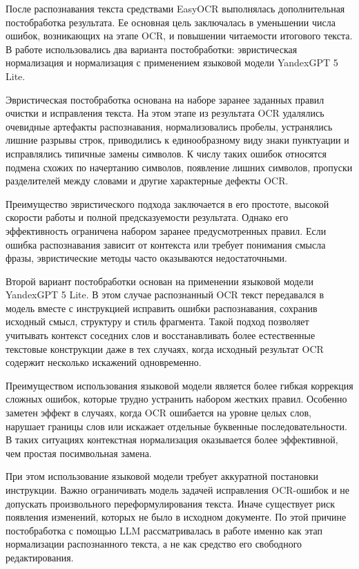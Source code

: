 После распознавания текста средствами EasyOCR выполнялась дополнительная постобработка результата. Ее основная цель заключалась в уменьшении числа ошибок, возникающих на этапе OCR, и повышении читаемости итогового текста. В работе использовались два варианта постобработки: эвристическая нормализация и нормализация с применением языковой модели YandexGPT 5 Lite.

Эвристическая постобработка основана на наборе заранее заданных правил очистки и исправления текста. На этом этапе из результата OCR удалялись очевидные артефакты распознавания, нормализовались пробелы, устранялись лишние разрывы строк, приводились к единообразному виду знаки пунктуации и исправлялись типичные замены символов. К числу таких ошибок относятся подмена схожих по начертанию символов, появление лишних символов, пропуски разделителей между словами и другие характерные дефекты OCR.

Преимущество эвристического подхода заключается в его простоте, высокой скорости работы и полной предсказуемости результата. Однако его эффективность ограничена набором заранее предусмотренных правил. Если ошибка распознавания зависит от контекста или требует понимания смысла фразы, эвристические методы часто оказываются недостаточными.

Второй вариант постобработки основан на применении языковой модели YandexGPT 5 Lite. В этом случае распознанный OCR текст передавался в модель вместе с инструкцией исправить ошибки распознавания, сохранив исходный смысл, структуру и стиль фрагмента. Такой подход позволяет учитывать контекст соседних слов и восстанавливать более естественные текстовые конструкции даже в тех случаях, когда исходный результат OCR содержит несколько искажений одновременно.

Преимуществом использования языковой модели является более гибкая коррекция сложных ошибок, которые трудно устранить набором жестких правил. Особенно заметен эффект в случаях, когда OCR ошибается на уровне целых слов, нарушает границы слов или искажает отдельные буквенные последовательности. В таких ситуациях контекстная нормализация оказывается более эффективной, чем простая посимвольная замена.

При этом использование языковой модели требует аккуратной постановки инструкции. Важно ограничивать модель задачей исправления OCR-ошибок и не допускать произвольного переформулирования текста. Иначе существует риск появления изменений, которых не было в исходном документе. По этой причине постобработка с помощью LLM рассматривалась в работе именно как этап нормализации распознанного текста, а не как средство его свободного редактирования.